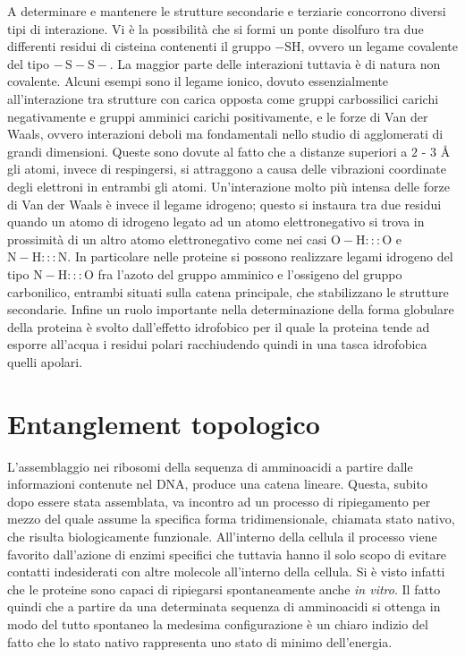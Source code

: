 A determinare e mantenere le strutture secondarie e terziarie concorrono diversi tipi di interazione. Vi è la possibilità che si formi un ponte disolfuro tra due differenti residui di cisteina contenenti il gruppo $  - \mathrm{SH} $, ovvero un legame covalente del tipo $  - \, \mathrm{S} - \mathrm{S} - $. La maggior parte delle interazioni tuttavia è di natura non covalente.
Alcuni esempi sono  il legame ionico, dovuto essenzialmente all'interazione tra strutture con carica opposta come gruppi carbossilici carichi negativamente e gruppi amminici carichi positivamente, e le forze di Van der Waals, ovvero interazioni deboli ma fondamentali nello studio di agglomerati di grandi dimensioni. Queste sono dovute al fatto che a distanze superiori a $ 2 $ - $ 3 $ \AA{} gli atomi, invece di respingersi, si attraggono a causa delle vibrazioni coordinate degli elettroni in entrambi gli atomi.
Un'interazione molto più intensa delle forze di Van der Waals è invece il legame idrogeno; questo si instaura tra due residui quando un atomo di idrogeno legato ad un atomo elettronegativo si trova in prossimità di un altro atomo elettronegativo come nei casi $ \mathrm{O} - \mathrm{H} ::: \mathrm{O} $ e $ \mathrm{N}  - \mathrm{H} ::: \mathrm{N} $. In particolare nelle proteine si possono realizzare legami idrogeno del tipo $ \mathrm{N}  - \mathrm{H} ::: \mathrm{O} $ fra l'azoto del gruppo amminico e l'ossigeno del gruppo carbonilico, entrambi situati sulla catena principale, che stabilizzano le strutture secondarie.   
Infine un ruolo importante nella determinazione della forma globulare della proteina è svolto dall'effetto idrofobico per il quale la proteina tende ad esporre all'acqua i residui polari racchiudendo quindi in una tasca idrofobica quelli apolari. \cite{protein_physics}

\section{Entanglement topologico}
L'assemblaggio nei ribosomi della sequenza di amminoacidi a partire dalle informazioni contenute nel DNA, produce una catena lineare. Questa, subito dopo essere stata assemblata, va incontro ad un processo di ripiegamento per mezzo del quale assume la specifica forma tridimensionale, chiamata stato nativo, che risulta biologicamente funzionale. All'interno della cellula il processo viene favorito dall'azione di enzimi specifici che tuttavia hanno il solo scopo di evitare contatti indesiderati con altre molecole all'interno della cellula. Si è visto infatti che le proteine sono capaci di ripiegarsi spontaneamente anche \textit{in vitro}. \cite{protein_physics} Il fatto quindi che a partire da una determinata sequenza di amminoacidi si ottenga in modo del tutto spontaneo la medesima configurazione è un chiaro indizio del fatto che lo stato nativo rappresenta uno stato di minimo dell'energia.
 
